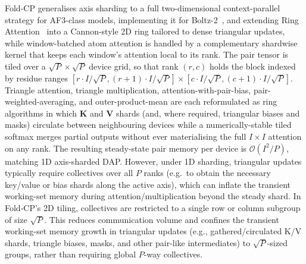 Fold-CP \parencite{lin_fold-cp_2026} generalises axis sharding to a full two-dimensional 
context-parallel strategy for AF3-class models, implementing it for
Boltz-2~\parencite{passaroBoltz2AccurateEfficient2025}, and extending Ring
Attention~\parencite{liuRingAttentionBlockwise2023} 
into a Cannon-style 2D ring tailored to dense triangular updates, while window-batched
atom attention is handled by a complementary shardwise kernel that keeps each 
window's attention local to its rank. The pair tensor is tiled over a 
$\sqrt{P}\times\sqrt{P}$ device grid, so that rank $(r,c)$ holds the block indexed 
by residue ranges $[r\cdot I/\sqrt{P}, (r{+}1)\cdot I/\sqrt{P}]\times [c\cdot I/\sqrt{P}, (c{+}1)\cdot I/\sqrt{P}]$. 
Triangle attention, triangle multiplication, attention-with-pair-bias, pair-weighted-averaging, 
and outer-product-mean are each reformulated as ring algorithms in which $\mathbf{K}$ 
and $\mathbf{V}$ shards (and, where required, triangular biases and masks) circulate 
between neighbouring devices while a numerically-stable tiled softmax merges partial 
outputs without ever materialising the full $I\times I$ attention on any rank. 
The resulting steady-state pair memory per device is $\mathcal{O}(I^2/P)$, matching 
1D axis-sharded DAP. However, under 1D sharding, triangular updates typically require 
collectives over all $P$ ranks (e.g.\ to obtain the necessary key/value or bias 
shards along the active axis), which can inflate the transient working-set memory 
during attention/multiplication beyond the steady shard. In Fold‑CP’s 2D tiling, 
collectives are restricted to a single row or column subgroup of size $\sqrt{P}$. 
This reduces communication volume and confines the transient working-set memory growth
in triangular updates (e.g., gathered/circulated K/V shards, triangle biases, masks,
and other pair-like intermediates) to $\sqrt{P}$-sized groups, rather than requiring
global $P$-way collectives.
